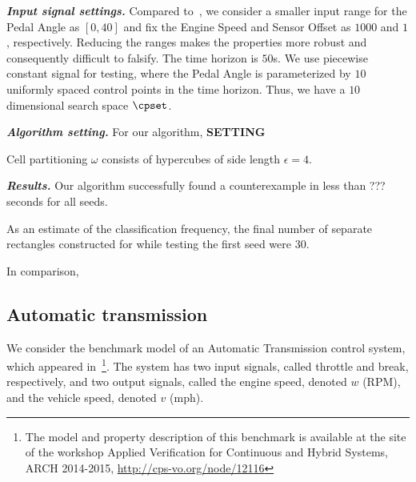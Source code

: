 \emph{\textbf{Input signal settings.}}
Compared to~\cite{Dreossi2015}, we consider a smaller input range for
the Pedal Angle as $[0,40]$ and fix the Engine Speed and
Sensor Offset as $1000$ and $1$, respectively. Reducing the ranges
makes the properties more robust and consequently difficult to
falsify.  The time horizon is $50$s.  We use piecewise constant
signal for testing, where the Pedal Angle is parameterized by $10$
uniformly spaced control points in the time horizon.  Thus, we
have a $10$ dimensional search space $\cpset$.%

\emph{\textbf {Algorithm setting.}}  For our algorithm, {\bf SETTING}


Cell partitioning $\omega$
consists of hypercubes of side length $\epsilon=4$. 

 \emph{\textbf {Results.}} Our algorithm successfully found a counterexample in less
than ??? seconds for all seeds. 

As an estimate of the classification
frequency, the final number of separate rectangles constructed for
while testing the first seed were 30.  

In comparison, 



\vspace{-1em}
\subsection{Automatic transmission} \label{sec:autotrans}
We consider the benchmark model of an Automatic Transmission control
system, which appeared in~\cite{FainekosARCH1415}\footnote{The model
and property description of this benchmark is available at the site of
the workshop Applied Verification for Continuous and Hybrid Systems,
ARCH 2014-2015, \url{http://cps-vo.org/node/12116}}.  The system has
two input signals, called throttle and break, respectively, and two
output signals, called the engine speed, denoted $w$ (RPM), and the vehicle
speed, denoted $v$ (mph).%

